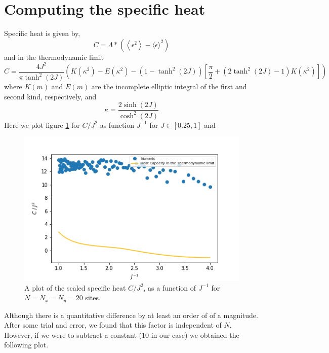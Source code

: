 \documentclass{cernatsnote}
\begin{document}
\section{Computing the specific heat}
Specific heat is given by,
\begin{equation}
    C=\Lambda *\left(\left\langle\epsilon^2\right\rangle-\langle\epsilon\rangle^2\right)
\end{equation}
and in the thermodynamic limit
\begin{equation}
    C=\frac{4 J^2}{\pi \tanh ^2(2 J)}\left(K\left(\kappa^2\right)-E\left(\kappa^2\right)-\left(1-\tanh ^2(2 J)\right)\left[\frac{\pi}{2}+\left(2 \tanh ^2(2 J)-1\right) K\left(\kappa^2\right)\right]\right)
\end{equation}
where $K(m)$ and $E(m)$ are the incomplete elliptic integral of the first and second kind, respectively, and
\begin{equation}
    \kappa=\frac{2 \sinh (2 J)}{\cosh ^2(2 J)}
\end{equation}
Here we plot figure \ref{fig:c_v_j} for $C/J^{2}$ as function $J^{-1}$ for $J \in [0.25,1]$ and 
\begin{figure}[H]
    \centering
    \includegraphics[scale = 0.7]{images/c_v_j_20.png}
    \caption{A plot of the scaled specific heat $C/J^{2}$, as a function of $J^{-1}$ for $N = N_{x} = N_{y} = 20$ sites.}
    \label{fig:c_v_j}
\end{figure}
Although there is a quantitative difference by at least an order of of a magnitude. After some trial and error, we found that this factor is independent of $N$. However, if we were to subtract a constant ($10$ in our case) we obtained the following plot.
\end{document}
